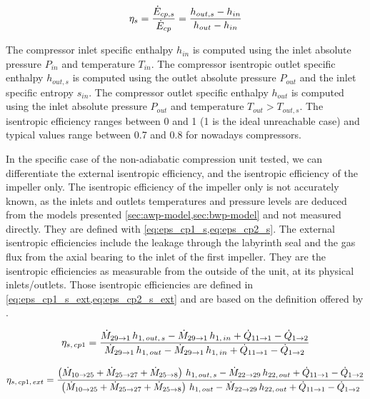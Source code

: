 \begin{equation}
  \label{eq:eta_s_cp}
  \eta_s = \dfrac{\dot{E}_{cp,s}}{\dot{E}_{cp}} = \dfrac{h_{out,s} - h_{in}}
  {h_{out} - h_{in}}
  \tagaddtextone{$\left[ - \right]$}
\end{equation}

The compressor inlet specific enthalpy $h_{in}$ is computed using the
inlet absolute pressure $P_{in}$ and temperature $T_{in}$. The
compressor isentropic outlet specific enthalpy $h_{out,s}$ is computed
using the outlet absolute pressure $P_{out}$ and the inlet specific
entropy $s_{in}$. The compressor outlet specific enthalpy $h_{out}$ is
computed using the inlet absolute pressure $P_{out}$ and temperature
$T_{out} > T_{out,s}$. The isentropic efficiency ranges between 0 and
1 (1 is the ideal unreachable case) and typical values range between
0.7 and 0.8 for nowadays compressors.

In the specific case of the non-adiabatic compression unit tested, we
can differentiate the external isentropic efficiency, and the
isentropic efficiency of the impeller only. The isentropic efficiency
of the impeller only is not accurately known, as the inlets and
outlets temperatures and pressure levels are deduced from the models
presented \cref{sec:awp-model,sec:bwp-model} and not measured
directly. They are defined with \cref{eq:eps_cp1_s,eq:eps_cp2_s}. The
external isentropic efficiencies include the leakage through the
labyrinth seal and the gas flux from the axial bearing to the inlet of
the first impeller. They are the isentropic efficiencies as measurable
from the outside of the unit, at its physical inlets/outlets. Those
isentropic efficiencies are defined in
\cref{eq:eps_cp1_s_ext,eq:eps_cp2_s_ext} and are based on the
definition offered by \citet[p.\,201]{Borel-Favrat-2010a}.

\begin{equation}
  \label{eq:eps_cp1_s}
  \eta_{s,\,cp1} = \dfrac{\dotM{29}{1} \, h_{1,\,out,\,s} -
    \dotM{29}{1} \, h_{1,\,in} + \dot{Q}_{11 \rightarrow 1} -
    \dot{Q}_{1 \rightarrow 2}}{\dotM{29}{1} \, h_{1,\,out} - \dotM{29}{1} \,
    h_{1,\,in} + \dot{Q}_{11 \rightarrow 1} - \dot{Q}_{1 \rightarrow 2}}
  \tagaddtextone{$\left[-\right]$}
\end{equation}

\begin{equation}
  \label{eq:eps_cp1_s_ext}
  \eta_{s,\,cp1,\,ext} = \dfrac{\left( \dotM{10}{25} + \dotM{25}{27} +
      \dotM{25}{8} \right) \, h_{1,\,out,\,s} - \dotM{22}{29} \,
    h_{22,\,out} + \dot{Q}_{11 \rightarrow 1} - \dot{Q}_{1
      \rightarrow 2}}{\left( \dotM{10}{25} + \dotM{25}{27} +
      \dotM{25}{8} \right) \, h_{1,\,out} - \dotM{22}{29} \,
    h_{22,\,out} + \dot{Q}_{11 \rightarrow 1} - \dot{Q}_{1
      \rightarrow 2}}
  \tagaddtextone{$\left[-\right]$}
\end{equation}

